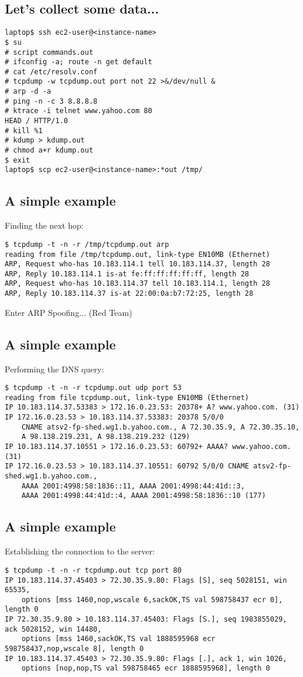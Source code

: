 \documentclass[xga]{xdvislides}
\begin{document}
\subsection{Let's collect some data...}
\begin{verbatim}
laptop$ ssh ec2-user@<instance-name>
$ su
# script commands.out
# ifconfig -a; route -n get default
# cat /etc/resolv.conf
# tcpdump -w tcpdump.out port not 22 >&/dev/null &
# arp -d -a
# ping -n -c 3 8.8.8.8
# ktrace -i telnet www.yahoo.com 80
HEAD / HTTP/1.0
# kill %1
# kdump > kdump.out
# chmod a+r kdump.out
$ exit
laptop$ scp ec2-user@<instance-name>:*out /tmp/
\end{verbatim}

\subsection{A simple example}
Finding the next hop:
\begin{verbatim}
$ tcpdump -t -n -r /tmp/tcpdump.out arp
reading from file /tmp/tcpdump.out, link-type EN10MB (Ethernet)
ARP, Request who-has 10.183.114.1 tell 10.183.114.37, length 28
ARP, Reply 10.183.114.1 is-at fe:ff:ff:ff:ff:ff, length 28
ARP, Request who-has 10.183.114.37 tell 10.183.114.1, length 28
ARP, Reply 10.183.114.37 is-at 22:00:0a:b7:72:25, length 28
\end{verbatim}
\vspace{.5in}
Enter ARP Spoofing... (Red Team)

\subsection{A simple example}
Performing the DNS query:
\begin{verbatim}
$ tcpdump -t -n -r tcpdump.out udp port 53
reading from file tcpdump.out, link-type EN10MB (Ethernet)
IP 10.183.114.37.53383 > 172.16.0.23.53: 20378+ A? www.yahoo.com. (31)
IP 172.16.0.23.53 > 10.183.114.37.53383: 20378 5/0/0
	CNAME atsv2-fp-shed.wg1.b.yahoo.com., A 72.30.35.9, A 72.30.35.10,
	A 98.138.219.231, A 98.138.219.232 (129)
IP 10.183.114.37.10551 > 172.16.0.23.53: 60792+ AAAA? www.yahoo.com. (31)
IP 172.16.0.23.53 > 10.183.114.37.10551: 60792 5/0/0 CNAME atsv2-fp-shed.wg1.b.yahoo.com.,
	AAAA 2001:4998:58:1836::11, AAAA 2001:4998:44:41d::3,
	AAAA 2001:4998:44:41d::4, AAAA 2001:4998:58:1836::10 (177)
\end{verbatim}

\subsection{A simple example}
Establishing the connection to the server:
\begin{verbatim}
$ tcpdump -t -n -r tcpdump.out tcp port 80
IP 10.183.114.37.45403 > 72.30.35.9.80: Flags [S], seq 5028151, win 65535,
	options [mss 1460,nop,wscale 6,sackOK,TS val 598758437 ecr 0], length 0
IP 72.30.35.9.80 > 10.183.114.37.45403: Flags [S.], seq 1983855029, ack 5028152, win 14480,
	options [mss 1460,sackOK,TS val 1888595968 ecr 598758437,nop,wscale 8], length 0
IP 10.183.114.37.45403 > 72.30.35.9.80: Flags [.], ack 1, win 1026,
	options [nop,nop,TS val 598758465 ecr 1888595968], length 0
\end{verbatim}
\end{document}
